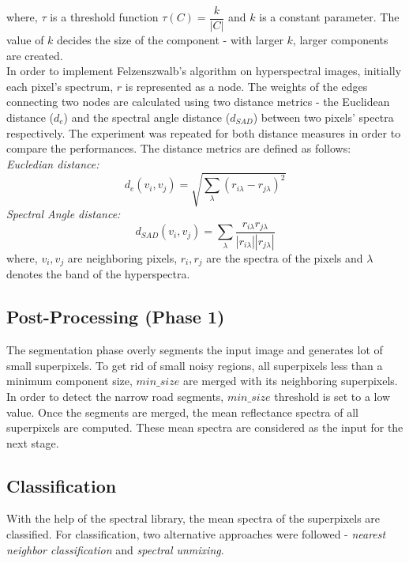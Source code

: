 \documentclass[12pt,twoside]{article}
\theoremstyle{plain}
\theoremstyle{definition}
\theoremstyle{remark}
\newcommand{\forceindent}{\leavevmode{\parindent=2em\indent}}
\begin{document}
where, $\tau$ is a threshold function $\tau(C) = \dfrac{k}{\lvert C\rvert}$ and $k$ is a constant parameter. The value of $k$ decides the size of the component - with larger $k$, larger components are created.\\
\forceindent In order to implement Felzenszwalb's algorithm on hyperspectral images, initially each pixel's spectrum, $r$ is represented as a node. The weights of the edges connecting two nodes are calculated using two distance metrics - the Euclidean distance ($d_e$) and the spectral angle distance ($d_{SAD}$) between two pixels' spectra respectively. The experiment was repeated for both distance measures in order to compare the performances. The distance metrics are defined as follows:\\
\forceindent \textit{Eucledian distance:}
\begin{equation}
\label{eq:euc}
d_e(v_i,v_j) = \sqrt{\sum_{\lambda} (r_{i\lambda} - r_{j\lambda})^{2}}
\end{equation}
\forceindent \textit{Spectral Angle distance:}
\begin{equation}
\label{eq:sad}
d_{SAD}(v_i,v_j) = \sum_{\lambda} \dfrac{r_{i\lambda}r_{j\lambda}}{|r_{i\lambda}||r_{j\lambda}|}
\end{equation}
where, $v_i,v_j$ are neighboring pixels, $r_i,r_j$ are the spectra of the pixels and $\lambda$ denotes the band of the hyperspectra. 

\subsection{Post-Processing (Phase 1)}
\label{sub sec:PP1}
The segmentation phase overly segments the input image and generates lot of small superpixels. To get rid of small noisy regions, all superpixels less than a minimum component size, $min\_size$ are merged with its neighboring superpixels. In order to detect the narrow road segments, $min\_size$ threshold is set to a low value. Once the segments are merged, the mean reflectance spectra of all superpixels are computed. These mean spectra are considered as the input for the next stage.

\subsection{Classification}
With the help of the spectral library, the mean spectra of the superpixels are classified. For classification, two alternative approaches were followed - \textit{nearest neighbor classification} and \textit{spectral unmixing}.
\end{document}
